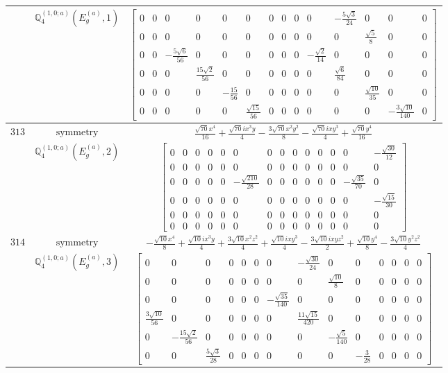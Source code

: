 \documentclass[fleqn,8pt,landscape]{jsarticle}
\begin{document}
\begin{longtable}{ccc}
$  $ & $ \mathbb{Q}_{4}^{(1,0;a)}(E_{g}^{(a)},1) $ & $ \begin{bmatrix} 0 & 0 & 0 & 0 & 0 & 0 & 0 & 0 & 0 & 0 & - \frac{5 \sqrt{3}}{24} & 0 & 0 & 0 \\ 0 & 0 & 0 & 0 & 0 & 0 & 0 & 0 & 0 & 0 & 0 & \frac{\sqrt{5}}{8} & 0 & 0 \\ 0 & 0 & - \frac{5 \sqrt{6}}{56} & 0 & 0 & 0 & 0 & 0 & 0 & - \frac{\sqrt{2}}{14} & 0 & 0 & 0 & 0 \\ 0 & 0 & 0 & \frac{15 \sqrt{2}}{56} & 0 & 0 & 0 & 0 & 0 & 0 & \frac{\sqrt{6}}{84} & 0 & 0 & 0 \\ 0 & 0 & 0 & 0 & - \frac{15}{56} & 0 & 0 & 0 & 0 & 0 & 0 & \frac{\sqrt{10}}{35} & 0 & 0 \\ 0 & 0 & 0 & 0 & 0 & \frac{\sqrt{15}}{56} & 0 & 0 & 0 & 0 & 0 & 0 & - \frac{3 \sqrt{10}}{140} & 0 \end{bmatrix} $ \\ \hline
$ 313 $ & $ \text{symmetry} $ & $ \frac{\sqrt{70} x^{4}}{16} + \frac{\sqrt{70} i x^{3} y}{4} - \frac{3 \sqrt{70} x^{2} y^{2}}{8} - \frac{\sqrt{70} i x y^{3}}{4} + \frac{\sqrt{70} y^{4}}{16} $ \\
$  $ & $ \mathbb{Q}_{4}^{(1,0;a)}(E_{g}^{(a)},2) $ & $ \begin{bmatrix} 0 & 0 & 0 & 0 & 0 & 0 & 0 & 0 & 0 & 0 & 0 & 0 & 0 & - \frac{\sqrt{30}}{12} \\ 0 & 0 & 0 & 0 & 0 & 0 & 0 & 0 & 0 & 0 & 0 & 0 & 0 & 0 \\ 0 & 0 & 0 & 0 & 0 & - \frac{\sqrt{210}}{28} & 0 & 0 & 0 & 0 & 0 & 0 & - \frac{\sqrt{35}}{70} & 0 \\ 0 & 0 & 0 & 0 & 0 & 0 & 0 & 0 & 0 & 0 & 0 & 0 & 0 & - \frac{\sqrt{15}}{30} \\ 0 & 0 & 0 & 0 & 0 & 0 & 0 & 0 & 0 & 0 & 0 & 0 & 0 & 0 \\ 0 & 0 & 0 & 0 & 0 & 0 & 0 & 0 & 0 & 0 & 0 & 0 & 0 & 0 \end{bmatrix} $ \\ \hline
$ 314 $ & $ \text{symmetry} $ & $ - \frac{\sqrt{10} x^{4}}{8} + \frac{\sqrt{10} i x^{3} y}{4} + \frac{3 \sqrt{10} x^{2} z^{2}}{4} + \frac{\sqrt{10} i x y^{3}}{4} - \frac{3 \sqrt{10} i x y z^{2}}{2} + \frac{\sqrt{10} y^{4}}{8} - \frac{3 \sqrt{10} y^{2} z^{2}}{4} $ \\
$  $ & $ \mathbb{Q}_{4}^{(1,0;a)}(E_{g}^{(a)},3) $ & $ \begin{bmatrix} 0 & 0 & 0 & 0 & 0 & 0 & 0 & - \frac{\sqrt{30}}{24} & 0 & 0 & 0 & 0 & 0 & 0 \\ 0 & 0 & 0 & 0 & 0 & 0 & 0 & 0 & \frac{\sqrt{10}}{8} & 0 & 0 & 0 & 0 & 0 \\ 0 & 0 & 0 & 0 & 0 & 0 & - \frac{\sqrt{35}}{140} & 0 & 0 & 0 & 0 & 0 & 0 & 0 \\ \frac{3 \sqrt{10}}{56} & 0 & 0 & 0 & 0 & 0 & 0 & \frac{11 \sqrt{15}}{420} & 0 & 0 & 0 & 0 & 0 & 0 \\ 0 & - \frac{15 \sqrt{2}}{56} & 0 & 0 & 0 & 0 & 0 & 0 & - \frac{\sqrt{5}}{140} & 0 & 0 & 0 & 0 & 0 \\ 0 & 0 & \frac{5 \sqrt{3}}{28} & 0 & 0 & 0 & 0 & 0 & 0 & - \frac{3}{28} & 0 & 0 & 0 & 0 \end{bmatrix} $ \\ \hline

\end{longtable}
\end{document}
